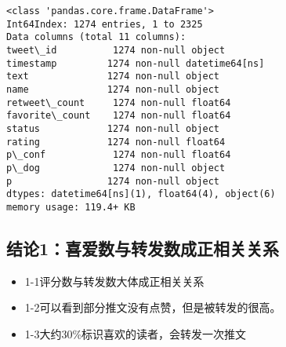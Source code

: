 \documentclass[11pt]{article}
\providecommand{\tightlist}{%
      \setlength{\itemsep}{0pt}\setlength{\parskip}{0pt}}
\begin{document}
    \begin{Verbatim}[commandchars=\\\{\}]
<class 'pandas.core.frame.DataFrame'>
Int64Index: 1274 entries, 1 to 2325
Data columns (total 11 columns):
tweet\_id          1274 non-null object
timestamp         1274 non-null datetime64[ns]
text              1274 non-null object
name              1274 non-null object
retweet\_count     1274 non-null float64
favorite\_count    1274 non-null float64
status            1274 non-null object
rating            1274 non-null float64
p\_conf            1274 non-null float64
p\_dog             1274 non-null object
p                 1274 non-null object
dtypes: datetime64[ns](1), float64(4), object(6)
memory usage: 119.4+ KB

    \end{Verbatim}

    \hypertarget{ux7ed3ux8bba1ux559cux7231ux6570ux4e0eux8f6cux53d1ux6570ux6210ux6b63ux76f8ux5173ux5173ux7cfb}{%
\subsection{结论1：喜爱数与转发数成正相关关系}\label{ux7ed3ux8bba1ux559cux7231ux6570ux4e0eux8f6cux53d1ux6570ux6210ux6b63ux76f8ux5173ux5173ux7cfb}}

\begin{itemize}
\tightlist
\item
  1-1评分数与转发数大体成正相关关系
\item
  1-2可以看到部分推文没有点赞，但是被转发的很高。
\item
  1-3大约30\%标识喜欢的读者，会转发一次推文
\end{itemize}
\end{document}
